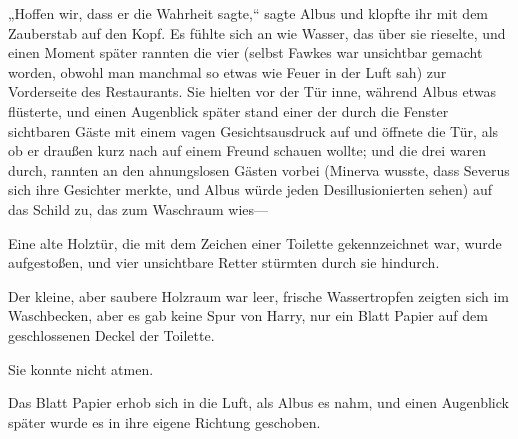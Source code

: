 „Hoffen wir, dass er die Wahrheit sagte,“ sagte Albus und klopfte ihr mit dem Zauberstab auf den Kopf. Es fühlte sich an wie Wasser, das über sie rieselte, und einen Moment später rannten die vier (selbst Fawkes war unsichtbar gemacht worden, obwohl man manchmal so etwas wie Feuer in der Luft sah) zur Vorderseite des Restaurants. Sie hielten vor der Tür inne, während Albus etwas flüsterte, und einen Augenblick später stand einer der durch die Fenster sichtbaren Gäste mit einem vagen Gesichtsausdruck auf und öffnete die Tür, als ob er draußen kurz nach auf einem Freund schauen wollte; und die drei waren durch, rannten an den ahnungslosen Gästen vorbei (Minerva wusste, dass Severus sich ihre Gesichter merkte, und Albus würde jeden Desillusionierten sehen) auf das Schild zu, das zum Waschraum wies—

Eine alte Holztür, die mit dem Zeichen einer Toilette gekennzeichnet war, wurde aufgestoßen, und vier unsichtbare Retter stürmten durch sie hindurch.

Der kleine, aber saubere Holzraum war leer, frische Wassertropfen zeigten sich im Waschbecken, aber es gab keine Spur von Harry, nur ein Blatt Papier auf dem geschlossenen Deckel der Toilette.

Sie konnte nicht atmen.

Das Blatt Papier erhob sich in die Luft, als Albus es nahm, und einen Augenblick später wurde es in ihre eigene Richtung geschoben.

